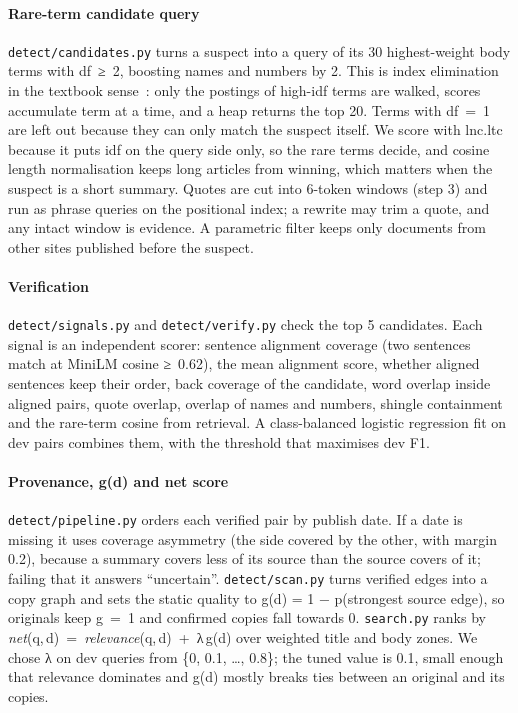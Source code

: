 \documentclass[11pt,a4paper]{article}
\newcommand{\code}[1]{\texttt{#1}}
\begin{document}
\paragraph{Rare-term candidate query} \code{detect/candidates.py} turns a suspect into a query of its 30 highest-weight body terms with df~≥~2, boosting names and numbers by 2. This is index elimination in the textbook sense~\cite[ch.~7]{iir2008}: only the postings of high-idf terms are walked, scores accumulate term at a time, and a heap returns the top 20. Terms with df~=~1 are left out because they can only match the suspect itself. We score with lnc.ltc because it puts idf on the query side only, so the rare terms decide, and cosine length normalisation keeps long articles from winning, which matters when the suspect is a short summary. Quotes are cut into 6-token windows (step 3) and run as phrase queries on the positional index; a rewrite may trim a quote, and any intact window is evidence. A parametric filter keeps only documents from other sites published before the suspect.

\paragraph{Verification} \code{detect/signals.py} and \code{detect/verify.py} check the top 5 candidates. Each signal is an independent scorer: sentence alignment coverage (two sentences match at MiniLM cosine ≥~0.62), the mean alignment score, whether aligned sentences keep their order, back coverage of the candidate, word overlap inside aligned pairs, quote overlap, overlap of names and numbers, shingle containment and the rare-term cosine from retrieval. A class-balanced logistic regression fit on dev pairs combines them, with the threshold that maximises dev F1.

\paragraph{Provenance, g(d) and net score} \code{detect/pipeline.py} orders each verified pair by publish date. If a date is missing it uses coverage asymmetry (the side covered by the other, with margin 0.2), because a summary covers less of its source than the source covers of it; failing that it answers ``uncertain''. \code{detect/scan.py} turns verified edges into a copy graph and sets the static quality to g(d) = 1 − p(strongest source edge), so originals keep g~=~1 and confirmed copies fall towards 0. \code{search.py} ranks by \textit{net}(q,\,d)~=~\textit{relevance}(q,\,d)~+~λ\,g(d) over weighted title and body zones. We chose λ on dev queries from \{0, 0.1, \ldots, 0.8\}; the tuned value is 0.1, small enough that relevance dominates and g(d) mostly breaks ties between an original and its copies.
\end{document}
